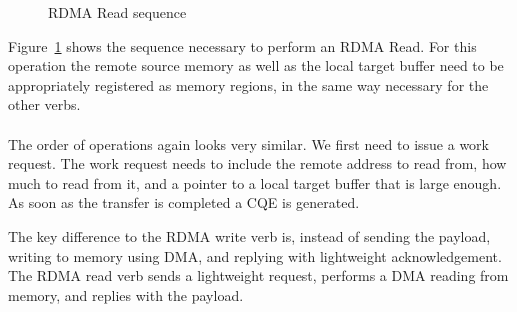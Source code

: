 \begin{figure}[!htp]
\begin{center}
\end{center}
\caption{RDMA Read sequence}
\label{fig:seq-rd}
\end{figure}

Figure~\ref{fig:seq-rd} shows the sequence necessary to perform an RDMA Read. For this operation the remote source memory as
well as the local target buffer need to be appropriately registered as memory regions, in the same way necessary for the
other verbs.

\paragraph{} The order of operations again looks very similar. We first need to issue a work request. The work request needs 
to include the remote address to read from, how much to read from it, and a pointer to a local target buffer that is large
enough. As soon as the  transfer is completed a CQE is generated. 

The key difference to the RDMA write verb is, 
instead of sending the payload, writing to memory using DMA, and replying with lightweight acknowledgement. The 
RDMA read verb sends a lightweight request, performs a DMA reading from memory, and replies with the payload.


